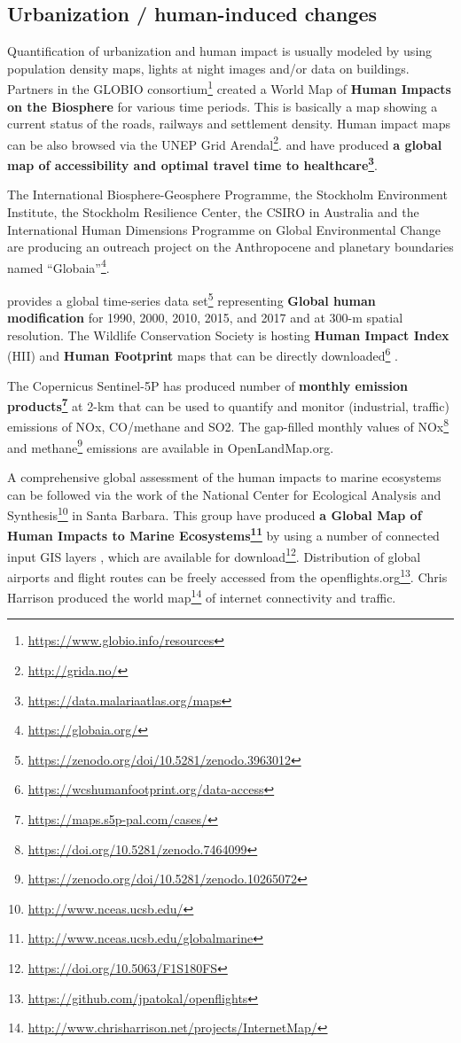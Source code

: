 \documentclass[
  graybox,natbib,nospthms]{svmono}
\renewcommand{\href}[2]{#2 (\url{#1})}
\renewcommand{\href}[2]{#2\footnote{\url{#1}}}
\begin{document}
\hypertarget{urbanization-human-induced-changes}{%
\subsection{Urbanization / human-induced changes}\label{urbanization-human-induced-changes}}

Quantification of urbanization and human impact is usually modeled by using population density maps, lights at night
images and/or data on buildings. Partners in the \href{https://www.globio.info/resources}{GLOBIO consortium} created a World Map
of \textbf{Human Impacts on the Biosphere} for various time periods. This is basically
a map showing a current status of the roads, railways and settlement density.
Human impact maps can be also browsed via the \href{http://grida.no/}{UNEP Grid Arendal}.
\citet{weiss2018global} and \citet{weiss_global_2020} have produced \textbf{\href{https://data.malariaatlas.org/maps}{a global map of accessibility and optimal travel time to healthcare}}.

The International Biosphere-Geosphere Programme, the Stockholm Environment Institute,
the Stockholm Resilience Center, the CSIRO in Australia and the International Human
Dimensions Programme on Global Environmental Change are producing an outreach project
on the Anthropocene and planetary boundaries named \href{https://globaia.org/}{``Globaia''}.

\citet{Theobald2020} provides a \href{https://zenodo.org/doi/10.5281/zenodo.3963012}{global time-series data set} representing \textbf{Global human modification} for 1990, 2000, 2010, 2015, and 2017 and at 300-m spatial resolution.
The Wildlife Conservation Society is hosting \textbf{Human Impact Index} (HII) and \textbf{Human Footprint} maps that can be directly \href{https://wcshumanfootprint.org/data-access}{downloaded} \citep{sanderson2022march}.

The Copernicus Sentinel-5P has produced number of \textbf{\href{https://maps.s5p-pal.com/cases/}{monthly emission products}} at 2-km that can be
used to quantify and monitor (industrial, traffic) emissions of NOx, CO/methane and SO2.
The gap-filled monthly values of \href{https://doi.org/10.5281/zenodo.7464099}{NOx} and \href{https://zenodo.org/doi/10.5281/zenodo.10265072}{methane} emissions are available in OpenLandMap.org.

A comprehensive global assessment of the human impacts to marine ecosystems can
be followed via the work of the \href{http://www.nceas.ucsb.edu/}{National Center for Ecological Analysis and Synthesis} in Santa Barbara.
This group have produced \textbf{\href{http://www.nceas.ucsb.edu/globalmarine}{a Global Map of Human Impacts to Marine Ecosystems}} by
using a number of connected input GIS layers \citep{Halpern2008}, which are available
for \href{https://doi.org/10.5063/F1S180FS}{download}. Distribution of global airports
and flight routes can be freely accessed from the \href{https://github.com/jpatokal/openflights}{openflights.org}.
Chris Harrison produced the \href{http://www.chrisharrison.net/projects/InternetMap/}{world map} of
internet connectivity and traffic.
\end{document}
